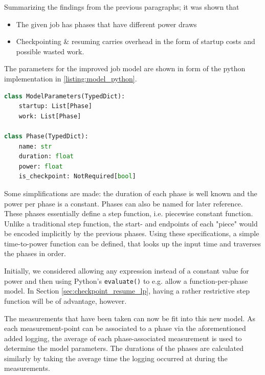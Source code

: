 Summarizing the findings from the previous paragraphs; it was shown that 

\begin{itemize}
    \item The given job has phases that have different power draws
    \item Checkpointing \& resuming carries overhead in the form of startup costs and possible wasted work.
\end{itemize}

The parameters for the improved job model are shown in form of the python implementation in \ref{listing:model_python}. 

\begin{lstlisting}[language=python, frame=single, numbers=none, caption={Python Model definition}, basicstyle=\ttfamily, label={listing:model_python}]
class ModelParameters(TypedDict):
    startup: List[Phase]
    work: List[Phase]
    
class Phase(TypedDict):
    name: str
    duration: float
    power: float
    is_checkpoint: NotRequired[bool]   
\end{lstlisting}

Some simplifications are made: the duration of each phase is well known and the power per phase is a constant. 
Phases can also be named for later reference.
These phases essentially define a step function, i.e. piecewise constant function.
Unlike a traditional step function, the start- and endpoints of each "piece" would be encoded implicitly by the previous phases.
Using these specifications, a simple time-to-power function can be defined, that looks up the input time and traverses the phases in order.

Initially, we considered allowing any expression instead of a constant value for power and then using Python's \verb|evaluate()| to e.g. allow a function-per-phase model.
In Section \ref{sec:checkpoint_resume_lp}, having a rather restrictive step function will be of advantage, however. 


The measurements that have been taken can now be fit into this new model. 
As each measurement-point can be associated to a phase via the aforementioned added logging, the average of each phase-associated measurement is used to determine the model parameters. 
The durations of the phases are calculated similarly by taking the average time the logging occurred at during the measurements.

